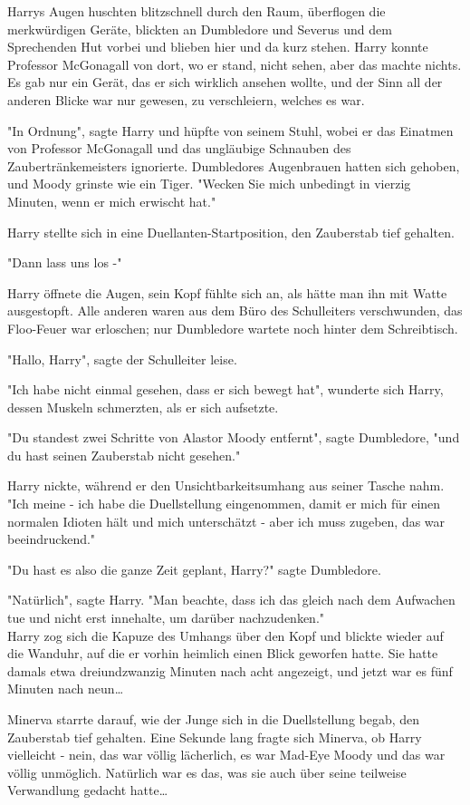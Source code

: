 {Harrys Augen huschten blitzschnell durch den Raum, überflogen die merkwürdigen Geräte, blickten an Dumbledore und Severus und dem Sprechenden Hut vorbei und blieben hier und da kurz stehen. Harry konnte Professor McGonagall von dort, wo er stand, nicht sehen, aber das machte nichts. Es gab nur ein Gerät, das er sich wirklich ansehen wollte, und der Sinn all der anderen Blicke war nur gewesen, zu verschleiern, welches es war.

"In Ordnung", sagte Harry und hüpfte von seinem Stuhl, wobei er das Einatmen von Professor McGonagall und das ungläubige Schnauben des Zaubertränkemeisters ignorierte. Dumbledores Augenbrauen hatten sich gehoben, und Moody grinste wie ein Tiger. "Wecken Sie mich unbedingt in vierzig Minuten, wenn er mich erwischt hat."

Harry stellte sich in eine Duellanten-Startposition, den Zauberstab tief gehalten.

"Dann lass uns los -"

Harry öffnete die Augen, sein Kopf fühlte sich an, als hätte man ihn mit Watte ausgestopft. Alle anderen waren aus dem Büro des Schulleiters verschwunden, das Floo-Feuer war erloschen; nur Dumbledore wartete noch hinter dem Schreibtisch.

"Hallo, Harry", sagte der Schulleiter leise.

"Ich habe nicht einmal gesehen, dass er sich bewegt hat", wunderte sich Harry, dessen Muskeln schmerzten, als er sich aufsetzte.

"Du standest zwei Schritte von Alastor Moody entfernt", sagte Dumbledore, "und du hast seinen Zauberstab nicht gesehen."

Harry nickte, während er den Unsichtbarkeitsumhang aus seiner Tasche nahm. "Ich meine - ich habe die Duellstellung eingenommen, damit er mich für einen normalen Idioten hält und mich unterschätzt - aber ich muss zugeben, das war beeindruckend."

"Du hast es also die ganze Zeit geplant, Harry?" sagte Dumbledore.

"Natürlich", sagte Harry. "Man beachte, dass ich das gleich nach dem Aufwachen tue und nicht erst innehalte, um darüber nachzudenken."\\ Harry zog sich die Kapuze des Umhangs über den Kopf und blickte wieder auf die Wanduhr, auf die er vorhin heimlich einen Blick geworfen hatte. Sie hatte damals etwa dreiundzwanzig Minuten nach acht angezeigt, und jetzt war es fünf Minuten nach neun…

Minerva starrte darauf, wie der Junge sich in die Duellstellung begab, den Zauberstab tief gehalten. Eine Sekunde lang fragte sich Minerva, ob Harry vielleicht - nein, das war völlig lächerlich, es war Mad-Eye Moody und das war völlig unmöglich. Natürlich war es das, was sie auch über seine teilweise Verwandlung gedacht hatte…

}
